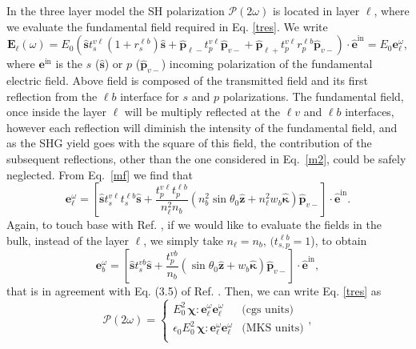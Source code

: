 In the three layer model the SH polarization $\boldsymbol{\mathcal{P}}(2\omega)$ is located in layer $\ell$,
where we evaluate the fundamental field required in Eq. \eqref{tres}.
We write
\begin{equation}\label{m2}
\mathbf{E}_{\ell}(\omega)=E_{0}\left(
\hat{\mathbf{s}} t^{v\ell}_s(1+r^{\ell b}_s)\hat{\mathbf{s}}
+
\hat{\mathbf{p}}_{\ell-}
 t^{v\ell}_{p}
\hat{\mathbf{p}}_{v-}
+
\hat{\mathbf{p}}_{\ell+}
t^{v\ell}_{p}r^{\ell b}_{p}
\hat{\mathbf{p}}_{v-}
\right)\cdot\hat{\mathbf{e}}^{\mathrm{in}}=E_{0}\mathbf{e}^\omega_{\ell}
,
\end{equation} 
where $\mathbf{e}^{\mathrm{in}}$ is the $s$ ($\hat{\mathbf{s}}$) or $p$
($\hat{\mathbf{p}}_{v-}$)
incoming polarization of
the fundamental electric field. 
Above field is composed of the transmitted field and its first
reflection from the $\ell b$ interface for $s$ and $p$ polarizations.
The fundamental field, once inside the layer $\ell$ will be multiply
reflected at the $\ell v$ and $\ell b$ interfaces, however each
reflection will diminish the intensity of the fundamental field, and as the SHG
yield goes with the square of this field, the contribution of the
subsequent reflections, other than the one considered in
Eq.~\eqref{m2},  could be safely neglected.
From Eq.~\eqref{mf}
we find that
\begin{equation}\label{m12}
\mathbf{e}^{\omega}_{\ell}
= \left[
\hat{\mathbf{s}}t_{s}^{v\ell}t_{s}^{\ell b}\hat{\mathbf{s}} 
+ \frac{t^{v\ell}_{p}t^{\ell b}_{p}}
       {n^2_\ell n_b}
\left(
  n^2_b
\sin\theta_{0}\hat{\mathbf{z}}
+ n^2_\ell w_b\hat{\boldsymbol{\kappa}}
\right)
\hat{\mathbf{p}}_{v-}
\right]
\cdot\hat{\mathbf{e}}^{\mathrm{in}}.  
\end{equation}  
Again, to touch base with Ref. \cite{mizrahiJOSA88},
if we would like to evaluate the fields in the bulk, instead of the layer
$\ell$, we simply take 
$n_\ell=n_b,\,(t^{\ell b}_{s,p}=1$), to obtain
\begin{equation}\label{m13}
\mathbf{e}^{\omega}_{b}
= \left[
\hat{\mathbf{s}}t_{s}^{vb}\hat{\mathbf{s}}
+ \frac{t^{vb}_{p}}{n_b}
\left(
\sin\theta_{0}\hat{\mathbf{z}} + w_b\hat{\boldsymbol{\kappa}}
\right) 
\hat{\mathbf{p}}_{v-}
\right]
\cdot\hat{\mathbf{e}}^{\mathrm{in}},  
\end{equation} 
that is in agreement with Eq. (3.5) of Ref. \cite{mizrahiJOSA88}.
Then,
 we can write Eq. \eqref{tres} as
\begin{equation}\label{m4}
\boldsymbol{\mathcal{P}}(2\omega) = 
\left\{
\begin{array}{cc}  
E^{2}_{0}\,\boldsymbol{\chi}:\mathbf{e}^{\omega}_{\ell}\mathbf{e}^{\omega}_{\ell}
& \text{(cgs units)} \\
\epsilon_{0}E^{2}_{0}\,\boldsymbol{\chi}:\mathbf{e}^{\omega}_{\ell}\mathbf{e}^{\omega}_{\ell}
& \text{(MKS units)} \\
\end{array}
\right.
,
\end{equation}
